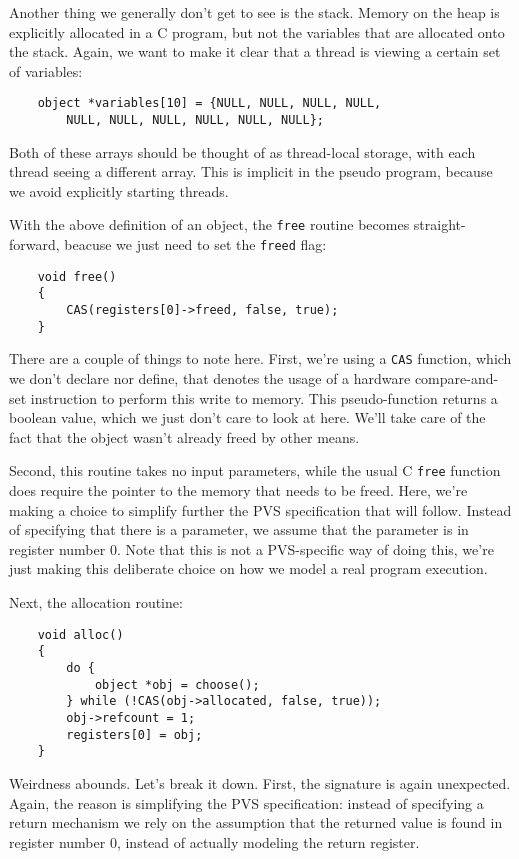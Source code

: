 Another thing we generally don't get to see is the stack.
Memory on the heap is explicitly allocated in a C program, but not the variables that are allocated onto the stack.
Again, we want to make it clear that a thread is viewing a certain set of variables:
\begin{verbatim}
	object *variables[10] = {NULL, NULL, NULL, NULL,
	    NULL, NULL, NULL, NULL, NULL, NULL};
\end{verbatim}

Both of these arrays should be thought of as thread-local storage, with each thread seeing a different array.
This is implicit in the pseudo program, because we avoid explicitly starting threads.

With the above definition of an object, the \texttt{free} routine becomes straight-forward, beacuse we just need to set the \texttt{freed} flag:
\begin{verbatim}
	void free()
	{
	    CAS(registers[0]->freed, false, true);
	}
\end{verbatim}

There are a couple of things to note here.
First, we're using a \texttt{CAS} function, which we don't declare nor define, that denotes the usage of a hardware compare-and-set instruction to perform this write to memory.
This pseudo-function returns a boolean value, which we just don't care to look at here.
We'll take care of the fact that the object wasn't already freed by other means.

Second, this routine takes no input parameters, while the usual C \texttt{free} function does require the pointer to the memory that needs to be freed.
Here, we're making a choice to simplify further the PVS specification that will follow.
Instead of specifying that there is a parameter, we assume that the parameter is in register number 0.
Note that this is not a PVS-specific way of doing this, we're just making this deliberate choice on how we model a real program execution.

Next, the allocation routine:
\begin{verbatim}
	void alloc()
	{
	    do {
	        object *obj = choose();
	    } while (!CAS(obj->allocated, false, true));
	    obj->refcount = 1;
	    registers[0] = obj;
	}
\end{verbatim}

Weirdness abounds.
Let's break it down.
First, the signature is again unexpected.
Again, the reason is simplifying the PVS specification: instead of specifying a return mechanism we rely on the assumption that the returned value is found in register number 0, instead of actually modeling the return register.

